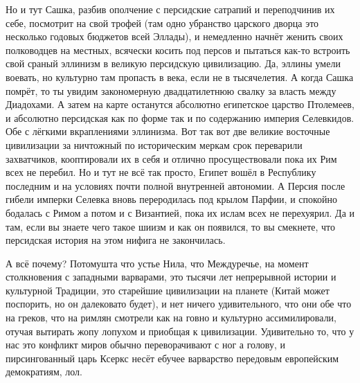 Но и тут Сашка, разбив ополчение с персидские сатрапий и переподчинив их себе, посмотрит на свой трофей (там одно убранство царского дворца это несколько годовых бюджетов всей Эллады), и немедленно начнёт женить своих полководцев на местных, всячески косить под персов и пытаться как-то встроить свой сраный эллинизм в великую персидскую цивилизацию. Да, эллины умели воевать, но культурно там пропасть в века, если не в тысячелетия. А когда Сашка помрёт, то ты увидим закономерную двадцатилетнюю свалку за власть между Диадохами. А затем на карте останутся абсолютно египетское царство Птолемеев, и абсолютно персидская как по форме так и по содержанию империя Селевкидов. Обе с лёгкими вкраплениями эллинизма. Вот так вот две великие восточные цивилизации за ничтожный по историческим меркам срок переварили захватчиков, кооптировали их в себя и отлично просуществовали пока их Рим всех не перебил. Но и тут не всё так просто, Египет вошёл в Республику последним и на условиях почти полной внутренней автономии. А Персия после гибели имперки Селевка вновь переродилась под крылом Парфии, и спокойно бодалась с Римом а потом и с Византией, пока их ислам всех не перехуярил. Да и там, если вы знаете чего такое шиизм и как он появился, то вы смекнете, что персидская история на этом нифига не закончилась.


А всё почему? Потомушта что устье Нила, что Междуречье, на момент столкновения с западными варварами, это тысячи лет непрерывной истории и культурной Традиции, это старейшие цивилизации на планете (Китай может поспорить, но он далековато будет), и нет ничего удивительного, что они обе что на греков, что на римлян смотрели как на говно и культурно ассимилировали, отучая вытирать жопу лопухом и приобщая к цивилизации. Удивительно то, что у нас это конфликт миров обычно переворачивают с ног а голову, и пирсингованный царь Ксеркс несёт ебучее варварство передовым европейским демократиям, лол.


